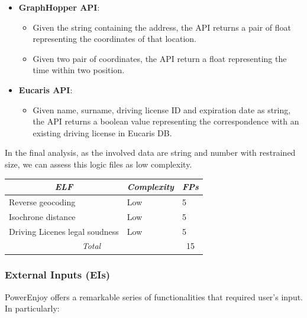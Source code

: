 \documentclass[english]{article}
\begin{document}
\begin{itemize}
	\item \textbf{GraphHopper API}:
		\begin{itemize}
			\item{Given the string containing the address, the API returns a pair of float representing the coordinates of that location.}
			\item{Given two pair of coordinates, the API return a float representing the time within two position.}
		\end{itemize}
	\item \textbf{Eucaris API}:
		\begin{itemize}
			\item{Given name, surname, driving license ID and expiration date as string, the API returns a boolean value representing the correspondence with an existing driving license in Eucaris DB.}
		\end{itemize}
\end{itemize}

In the final analysis, as the involved data are string and number with restrained size, we can assess this logic files as low complexity.\\

\begin{center}
	\begin{tabular}{ | p{6cm} | p{6cm} | p{6cm} }
		\hline
		\multicolumn{1}{|c|}{\textit{ELF}} & \multicolumn{1}{c|}{\textit{Complexity}} & \multicolumn{1}{c|}{\textit{FPs}} \\
		\hline
		Reverse geocoding & Low & 5 \\
		\hline
		Isochrone distance & Low & 5\\
		\hline
		Driving Licenes legal soudness & Low & 5\\
		\hline
		\multicolumn{2}{|c|}{\textit{Total}} & \multicolumn{1}{c|}{15} \\
		\hline
	\end{tabular}
\end{center}

\subsubsection{External Inputs (EIs)}

PowerEnjoy offers a remarkable series of functionalities that required user's input.\\
In particularly:
\end{document}
